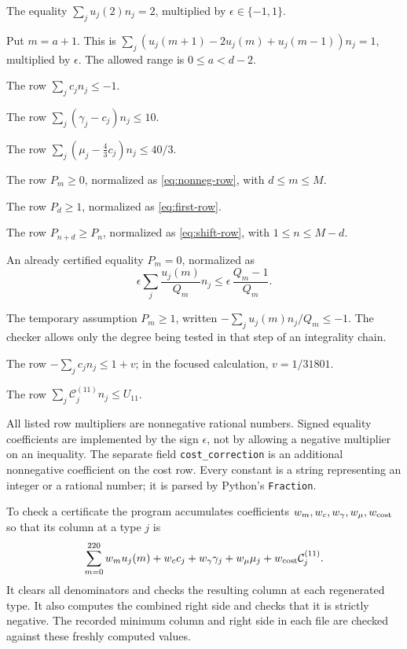 \documentclass[12pt,a4paper]{article}
\numberwithin{equation}{section}
\theoremstyle{definition}
\newcommand{\cost}{\mathcal C}
\begin{document}
\begin{description}[leftmargin=24mm,style=nextline]
\item[\texttt{eq,0,\(\epsilon\)}]
The equality \(\sum_j u_j(2)n_j=2\), multiplied by
\(\epsilon\in\{-1,1\}\).
\item[\texttt{eq,\(a\),\(\epsilon\)}, \(a\geq1\)]
Put \(m=a+1\). This is
\(\sum_j(u_j(m+1)-2u_j(m)+u_j(m-1))n_j=1\),
multiplied by \(\epsilon\).
The allowed range is \(0\leq a<d-2\).
\item[\texttt{base,0}]
The row \(\sum_jc_jn_j\leq-1\).
\item[\texttt{base,1}]
The row \(\sum_j(\gamma_j-c_j)n_j\leq10\).
\item[\texttt{base,2}]
The row \(\sum_j(\mu_j-\frac43c_j)n_j\leq40/3\).
\item[\texttt{nonneg,\(m\)}]
The row \(P_m\geq0\), normalized as
\eqref{eq:nonneg-row}, with \(d\leq m\leq M\).
\item[\texttt{first,\(d\)}]
The row \(P_d\geq1\), normalized as \eqref{eq:first-row}.
\item[\texttt{shift,\(n\),\(d\)}]
The row \(P_{n+d}\geq P_n\), normalized as
\eqref{eq:shift-row}, with \(1\leq n\leq M-d\).
\item[\texttt{zero,\(m\),\(\epsilon\)}]
An already certified equality \(P_m=0\), normalized as
\[
 \epsilon\sum_j\frac{u_j(m)}{Q_m}n_j
                      \leq\epsilon\,\frac{Q_m-1}{Q_m}.
\]
\item[\texttt{nonzero,\(m\)}]
The temporary assumption \(P_m\geq1\), written
\(-\sum_j u_j(m)n_j/Q_m\leq-1\).
The checker allows only the degree being tested in that step of
an integrality chain.
\item[\texttt{volume\_ceiling,\(v\)}]
The row \(-\sum_jc_jn_j\leq1+v\); in the focused calculation,
\(v=1/31801\).
\item[\texttt{cost}]
The row \(\sum_j\cost_j^{(11)}n_j\leq U_{11}\).
\end{description}

All listed row multipliers are nonnegative rational numbers.
Signed equality coefficients are implemented by the sign
\(\epsilon\), not by allowing a negative multiplier on an inequality.
The separate field \texttt{cost\_correction} is an additional
nonnegative coefficient on the cost row.
Every constant is a string representing an integer or a rational
number; it is parsed by Python's \texttt{Fraction}.

To check a certificate the program accumulates coefficients
\(w_m,w_c,w_\gamma,w_\mu,w_{\rm cost}\) so that its column at a
type \(j\) is
\[
 \sum_{m=0}^{220}w_mu_j(m)+w_cc_j+w_\gamma\gamma_j
                   +w_\mu\mu_j+w_{\rm cost}\cost_j^{(11)}.
\]
It clears all denominators and checks the resulting column at
each regenerated type.
It also computes the combined right side and checks that it is
strictly negative.
The recorded minimum column and right side in each file are checked
against these freshly computed values.
\end{document}
